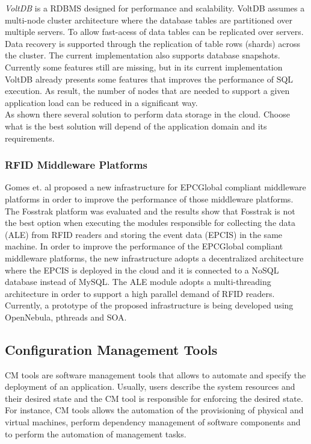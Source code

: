 \textit{VoltDB} \cite{stonebraker2013voltdb} is a \gls{RDBMS} designed for performance and scalability.
VoltDB assumes a multi-node cluster architecture where the database tables are partitioned over
multiple servers. To allow fast-acess of data tables can be replicated over servers. Data recovery is
supported through the replication of table rows (shards) across the cluster. The current implementation also
supports database snapshots. Currently some features still are missing, but in its current implementation
VoltDB already presents some features that improves the performance of SQL execution. As result, the
number of nodes that are needed to support a given application load can be reduced in a significant way.\\

As shown there several solution to perform data storage in the cloud. Choose what is the best solution
will depend of the application domain and its requirements.

\subsubsection{RFID Middleware Platforms}
\label{subs:rdbms_clusters}
Gomes et. al \cite{gomes2014future} proposed a new infrastructure for EPCGlobal compliant middleware
platforms in order to improve the performance of those middleware platforms. The Fosstrak platform
was evaluated and the results show that Fosstrak is not the best option when executing the modules
responsible for collecting the data (ALE) from RFID readers and storing the event data
(EPCIS) in the same  machine. In order to improve the performance of the EPCGlobal compliant middleware platforms,
the new infrastructure adopts a decentralized architecture where the EPCIS is deployed in the
cloud and it is connected to a NoSQL database instead of MySQL. The ALE module adopts a
multi-threading architecture in order to support a high parallel demand of RFID readers.
Currently, a prototype of the proposed infrastructure is being developed using OpenNebula, pthreads
and \gls{SOA}.

\subsection{Configuration Management Tools}
\label{sub:cm_tools}
\gls{CM} tools are software management tools that allows to automate and specify the deployment of an
application. Usually, users describe the system resources and their desired state and the \gls{CM}
tool is responsible for enforcing the desired state. For instance, \gls{CM} tools allows the automation
of the provisioning of physical and virtual machines, perform dependency management of software
components and to perform the automation of management tasks.\\

